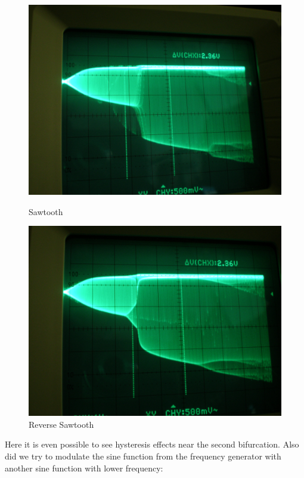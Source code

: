 \begin{figure}[H]
\begin{minipage}{0.5\textwidth}
\centering \includegraphics[width=\textwidth]{Fotos2/13.jpg}
\caption{Sawtooth}
\end{minipage}
\begin{minipage}{0.5\textwidth}
\centering \includegraphics[width=\textwidth]{Fotos2/15.jpg}
\caption{Reverse Sawtooth}
\end{minipage}
\end{figure}

Here it is even possible to see hysteresis effects near the second bifurcation. Also did we try to modulate the sine function from the frequency generator with another sine function with lower frequency:

